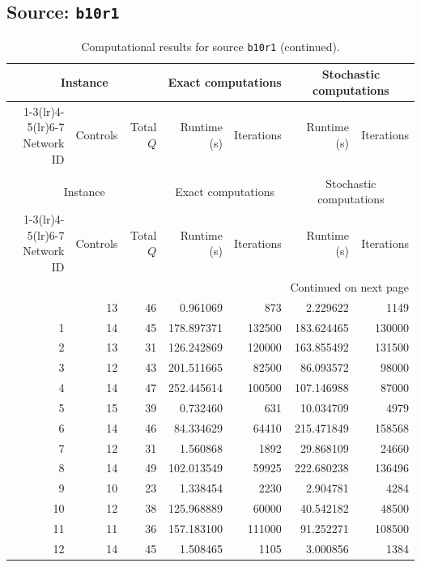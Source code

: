 \documentclass{article}
\begin{document}
\begin{landscape}
\subsection*{Source: \texttt{b10r1}}

\begin{longtable}{rrrrrrr}
\caption{Computational results for source \texttt{b10r1}.}\\
\toprule
\multicolumn{3}{c}{Instance} & \multicolumn{2}{c}{Exact computations} & \multicolumn{2}{c}{Stochastic computations} \\
\cmidrule(lr){1-3}\cmidrule(lr){4-5}\cmidrule(lr){6-7}
Network ID & Controls & Total $Q$ & Runtime (s) & Iterations & Runtime (s) & Iterations \\
\midrule
\endfirsthead
\caption[]{Computational results for source \texttt{b10r1} (continued).}\\
\toprule
\multicolumn{3}{c}{Instance} & \multicolumn{2}{c}{Exact computations} & \multicolumn{2}{c}{Stochastic computations} \\
\cmidrule(lr){1-3}\cmidrule(lr){4-5}\cmidrule(lr){6-7}
Network ID & Controls & Total $Q$ & Runtime (s) & Iterations & Runtime (s) & Iterations \\
\midrule
\endhead
\midrule
\multicolumn{7}{r}{Continued on next page} \\
\endfoot
\bottomrule
\endlastfoot
0 & 13 & 46 & 0.961069 & 873 & 2.229622 & 1149 \\
1 & 14 & 45 & 178.897371 & 132500 & 183.624465 & 130000 \\
2 & 13 & 31 & 126.242869 & 120000 & 163.855492 & 131500 \\
3 & 12 & 43 & 201.511665 & 82500 & 86.093572 & 98000 \\
4 & 14 & 47 & 252.445614 & 100500 & 107.146988 & 87000 \\
5 & 15 & 39 & 0.732460 & 631 & 10.034709 & 4979 \\
6 & 14 & 46 & 84.334629 & 64410 & 215.471849 & 158568 \\
7 & 12 & 31 & 1.560868 & 1892 & 29.868109 & 24660 \\
8 & 14 & 49 & 102.013549 & 59925 & 222.680238 & 136496 \\
9 & 10 & 23 & 1.338454 & 2230 & 2.904781 & 4284 \\
10 & 12 & 38 & 125.968889 & 60000 & 40.542182 & 48500 \\
11 & 11 & 36 & 157.183100 & 111000 & 91.252271 & 108500 \\
12 & 14 & 45 & 1.508465 & 1105 & 3.000856 & 1384 \\

\end{longtable}
\end{landscape}
\end{document}

